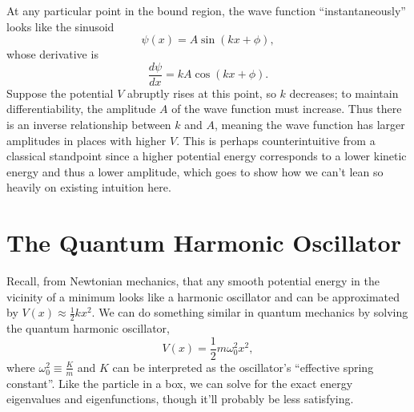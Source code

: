 \documentclass[../p052main.tex]{subfiles}
\begin{document}
At any particular point in the bound region, the wave function ``instantaneously'' looks like the sinusoid
\[ \psi(x) = A \sin (kx + \phi), \]
whose derivative is
\[ \frac{d\psi}{dx} = kA \cos (kx + \phi). \]
Suppose the potential $V$ abruptly rises at this point, so $k$ decreases; to maintain differentiability, the amplitude $A$ of the wave function must increase.
Thus there is an inverse relationship between $k$ and $A$, meaning the wave function has larger amplitudes in places with higher $V$.
This is perhaps counterintuitive from a classical standpoint since a higher potential energy corresponds to a lower kinetic energy and thus a lower amplitude, which goes to show how we can't lean so heavily on existing intuition here.


\section{The Quantum Harmonic Oscillator}
Recall, from Newtonian mechanics, that any smooth potential energy in the vicinity of a minimum looks like a harmonic oscillator and can be approximated by $V(x) \approx \frac{1}{2} kx^2$.
We can do something similar in quantum mechanics by solving the quantum harmonic oscillator,
\[ V(x) = \frac{1}{2}m \omega_0^2 x^2, \]
where $\omega_0^2 \equiv \frac{K}{m}$ and $K$ can be interpreted as the oscillator's ``effective spring constant''.
Like the particle in a box, we can solve for the exact energy eigenvalues and eigenfunctions, though it'll probably be less satisfying.
\end{document}
